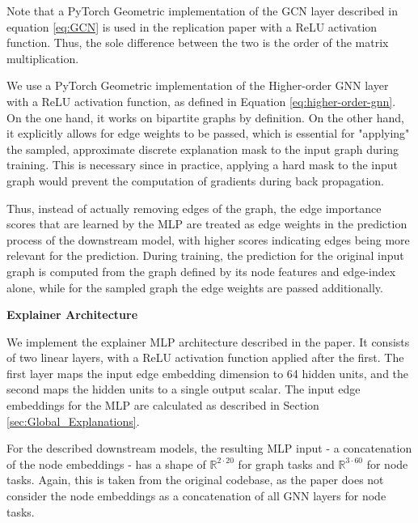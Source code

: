 Note that a PyTorch Geometric implementation of the GCN layer described in equation \ref{eq:GCN} is used in the replication paper \cite{holdijk2021re} with a ReLU activation function. Thus, the sole difference between the two is the order of the matrix multiplication. \bigskip

We use a PyTorch Geometric implementation of the Higher-order GNN layer with a ReLU activation function, as defined in Equation \ref{eq:higher-order-gnn}. On the one hand, it works on bipartite graphs by definition. On the other hand, it explicitly allows for edge weights to be passed, which is essential for "applying" the sampled, approximate discrete explanation mask to the input graph during training. This is necessary since in practice, applying a hard mask to the input graph would prevent the computation of gradients during back propagation.

Thus, instead of actually removing edges of the graph, the edge importance scores that are learned by the MLP are treated as edge weights in the prediction process of the downstream model, with higher scores indicating edges being more relevant for the prediction. During training, the prediction for the original input graph is computed from the graph defined by its node features and edge-index alone, while for the sampled graph the edge weights are passed additionally.\bigskip

\textbf{Explainer Architecture}\par
We implement the explainer MLP architecture described in the paper. It consists of two linear layers, with a ReLU activation function applied after the first. The first layer maps the input edge embedding dimension to 64 hidden units, and the second maps the hidden units to a single output scalar. The input edge embeddings for the MLP are calculated as described in Section \ref{sec:Global_Explanations}. 

For the described downstream models, the resulting MLP input - a concatenation of the node embeddings - has a shape of $\mathbb{R}^{2\cdot20}$ for graph tasks and $\mathbb{R}^{3\cdot60}$ for node tasks. Again, this is taken from the original codebase, as the paper does not consider the node embeddings as a concatenation of all GNN layers for node tasks.

